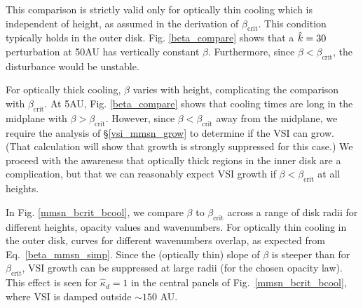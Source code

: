 This comparison is strictly valid only for optically thin cooling
which is independent of height, as assumed in the derivation of
$\beta_\mathrm{crit}$.  This condition typically holds in the outer
disk.   Fig. \ref{beta_compare} shows that a  $\hat{k}=30$ perturbation
at 50AU has vertically constant $\beta$. Furthermore, since $\beta <
\beta_\mathrm{crit}$, the disturbance would be unstable. 
 
For optically thick cooling, $\beta$ varies with height, complicating
the comparison with $\beta_\mathrm{crit}$.    
At 5AU, Fig. \ref{beta_compare} shows that cooling times are long in
the midplane with $\beta > \beta_\mathrm{crit}$. 
However, since $\beta < \beta_\mathrm{crit}$ away from the midplane,
we require the analysis of \S\ref{vsi_mmsn_grow} to determine if the
VSI can grow.  (That calculation will show that growth is strongly
suppressed for this case.)  We proceed with the awareness that
optically thick regions in the inner disk are a complication, but that
we can reasonably expect VSI growth if $\beta < \beta_\mathrm{crit}$
at all heights. 


%
%




In Fig. \ref{mmsn_bcrit_bcool}, we compare $\beta$ to
$\beta_\mathrm{crit}$ across a range of disk radii for different
heights, opacity values and wavenumbers. 
For optically thin cooling in the outer disk, curves for different
wavenumbers overlap, as expected from Eq.\ \ref{beta_mmsn_simp}. 
Since the (optically thin) slope of $\beta$ is steeper than
for $\beta_\mathrm{crit}$, VSI growth can be suppressed at large radii
(for the chosen opacity law).  This effect is seen for $\hat{\kappa}_d
= 1$ in the central panels of Fig.\ \ref{mmsn_bcrit_bcool}, where VSI
is damped outside $\sim 150$ AU. 


